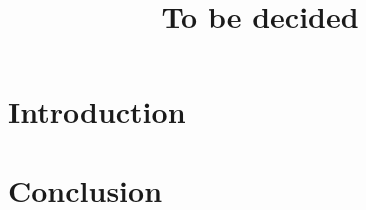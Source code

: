 \documentclass[letter,11pt]{article}
\title{To be decided}
\institute{Computer Laboratory, University of Cambridge}
\begin{document}
\maketitle


\section{Introduction}
\label{sect.introduction}

\section{Conclusion}
\label{sect.conclusion}
\end{document}

